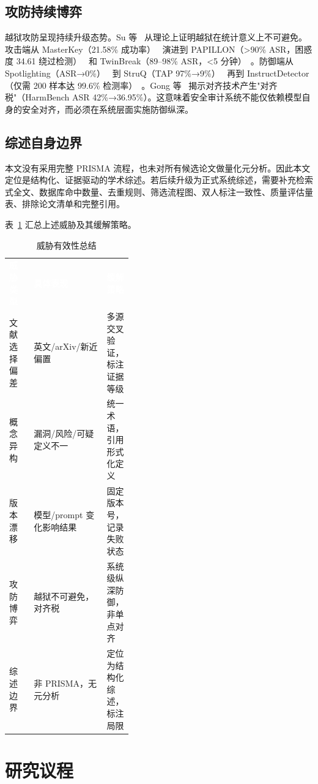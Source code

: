 \documentclass[11pt,a4paper,onecolumn]{article}
\newcommand{\tabheader}[1]{\textcolor{white}{\textbf{#1}}}
\begin{document}
\subsection{攻防持续博弈}
越狱攻防呈现持续升级态势。Su 等~\cite{su2024missionimpossible} 从理论上证明越狱在统计意义上不可避免。攻击端从 MasterKey（21.58\% 成功率）~\cite{deng2024masterkey} 演进到 PAPILLON（>90\% ASR，困惑度 34.61 绕过检测）~\cite{gong2025papillon} 和 TwinBreak（89--98\% ASR，<5 分钟）~\cite{krauss2025twinbreak}。防御端从 Spotlighting（ASR→0\%）~\cite{hines2024spotlighting} 到 StruQ（TAP 97\%→9\%）~\cite{chen2025struq} 再到 InstructDetector（仅需 200 样本达 99.6\% 检测率）~\cite{wen2025instrdetect}。Gong 等~\cite{gong2025safetyMisalign} 揭示对齐技术产生"对齐税"（HarmBench ASR 42\%→36.95\%）。这意味着安全审计系统不能仅依赖模型自身的安全对齐，而必须在系统层面实施防御纵深。

\subsection{综述自身边界}
本文没有采用完整 PRISMA 流程，也未对所有候选论文做量化元分析。因此本文定位是结构化、证据驱动的学术综述。若后续升级为正式系统综述，需要补充检索式全文、数据库命中数量、去重规则、筛选流程图、双人标注一致性、质量评估量表、排除论文清单和完整引用。

表~\ref{tab:threats_summary} 汇总上述威胁及其缓解策略。

\begin{table}[htbp]
\caption{威胁有效性总结}
\label{tab:threats_summary}
\centering
\small
\begin{tabularx}{\linewidth}{@{} p{0.20\linewidth}X p{0.20\linewidth} @{}}
\rowcolor{tabhead}
\tabheader{威胁类型} & \tabheader{具体表现} & \tabheader{缓解策略} \\
\rowcolor{tabalt} 文献选择偏差 & 英文/arXiv/新近偏置 & 多源交叉验证，标注证据等级 \\
概念异构 & 漏洞/风险/可疑定义不一 & 统一术语，引用形式化定义 \\
\rowcolor{tabalt} 版本漂移 & 模型/prompt 变化影响结果 & 固定版本号，记录失败状态 \\
攻防博弈 & 越狱不可避免，对齐税 & 系统级纵深防御，非单点对齐 \\
\rowcolor{tabalt} 综述边界 & 非 PRISMA，无元分析 & 定位为结构化综述，标注局限 \\
\end{tabularx}
\end{table}

\section{研究议程}
\end{document}
